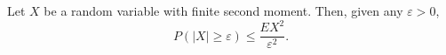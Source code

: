 Let $X$ be a random variable with finite second moment. Then, given any $\varepsilon > 0$,
$$P(|X| \geq \varepsilon) \leq \frac{EX^2}{\varepsilon^2}.$$
